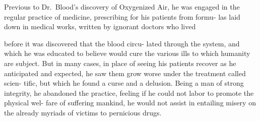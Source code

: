 \documentclass[10pt]{article}
\begin{document}
\begin{multicols}{3}
	Previous to Dr.~Blood's discovery of Oxygenized Air, he was engaged\linebreak
	in the regular practice of medicine, prescribing for his patients from formu-\linebreak
	las laid down in medical works, written by ignorant doctors who lived%
	\begin{figure}
		\vfill
	\end{figure}
	before it was discovered that the blood circu-\linebreak
	lated through the system, and which he was\linebreak
	educated to believe would cure the various ills\linebreak
	to which humanity are subject. But in many\linebreak
	cases, in place of seeing his patients recover\linebreak
	as he anticipated and expected, he saw them\linebreak
	grow worse under the treatment called scien-\linebreak
	tific, but which he found a curse and a\linebreak
	delusion. Being a man of strong integrity,\linebreak
	he abandoned the practice, feeling if he\linebreak
	could not labor to promote the physical wel-\linebreak
	fare of suffering mankind, he would not assist\linebreak
	in entailing misery on the already myriads of\linebreak
	victims to pernicious drugs.


\end{multicols}
\end{document}
